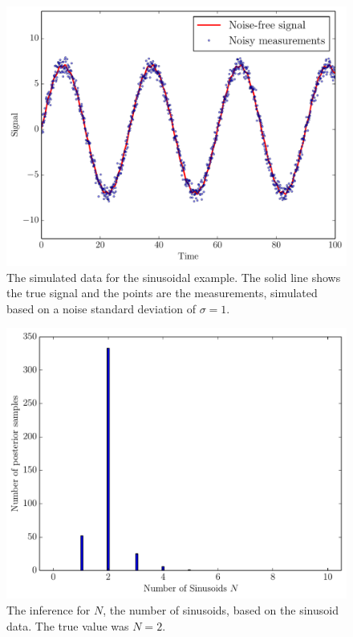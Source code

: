 \documentclass[letterpaper, 11pt]{article}
\begin{document}
\begin{figure}
\begin{center}
\includegraphics[scale=0.5]{sinewave_data.pdf}
\caption{The simulated data for the sinusoidal example. The solid line shows
the true signal and the points are the measurements, simulated based on a
noise standard deviation of $\sigma = 1$.
\label{fig:sinewave_data}}
\end{center}
\end{figure}

\begin{figure}
\begin{center}
\includegraphics[scale=0.5]{N_result.pdf}
\caption{The inference for $N$, the number of sinusoids, based on the
sinusoid data. The true value was $N=2$.
\label{fig:N_result}}
\end{center}
\end{figure}
\end{document}

